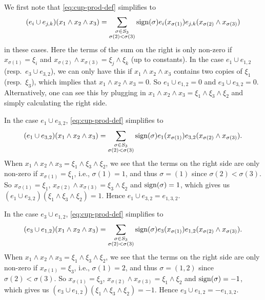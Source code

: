 We first note that \eqref{eq:cup-prod-def} simplifies to
\begin{equation*}
  (e_{i} \cup e_{j,k})(x_{1} \wedge x_{2} \wedge x_{3}) = \sum_{\substack{\sigma \in S_{3} \\ \sigma(2) < \sigma(3)}} \operatorname{sign}(\sigma) e_{i}(x_{\sigma(1)}) e_{j,k}(x_{\sigma(2)} \wedge x_{\sigma(3)})
\end{equation*}
in these cases. Here the terms of the sum on the right is only non-zero if $x_{\sigma(1)} = \xi_{i}$ and $x_{\sigma(2)} \wedge x_{\sigma(3)} = \xi_{j} \wedge \xi_{k}$ (up to constants). In the case $e_{1} \cup e_{1,2}$ (resp.\ $e_{3} \cup e_{3,2}$), we can only have this if $x_{1} \wedge x_{2} \wedge x_{3}$ contains two copies of $\xi_{1}$ (resp.\ $\xi_{3}$), which implies that $x_{1} \wedge x_{2} \wedge x_{3} = 0$. So $e_{1} \cup e_{1,2} = 0$ and $e_{3} \cup e_{3,2} = 0$. Alternatively, one can see this by plugging in $x_{1} \wedge x_{2} \wedge x_{3} = \xi_{1} \wedge \xi_{3} \wedge \xi_{2}$ and simply calculating the right side.

In the case $e_{1} \cup e_{3,2}$, \eqref{eq:cup-prod-def} simplifies to
\begin{equation*}
  (e_{1} \cup e_{3,2})(x_{1} \wedge x_{2} \wedge x_{3}) = \sum_{\substack{\sigma \in S_{3} \\ \sigma(2) < \sigma(3)}} \operatorname{sign}(\sigma) e_{1}(x_{\sigma(1)}) e_{3,2}(x_{\sigma(2)} \wedge x_{\sigma(3)}).
\end{equation*}
When $x_{1} \wedge x_{2} \wedge x_{3} = \xi_{1} \wedge \xi_{3} \wedge \xi_{2}$, we see that the terms on the right side are only non-zero if $x_{\sigma(1)} = \xi_{1}$, i.e., $\sigma(1)=1$, and thus $\sigma = (1)$ since $\sigma(2) < \sigma(3)$. So $x_{\sigma(1)} = \xi_{1}$, $x_{\sigma(2)} \wedge x_{\sigma(3)} = \xi_{3} \wedge \xi_{2}$ and $\operatorname{sign}(\sigma) = 1$, which gives us $(e_{1} \cup e_{3,2})(\xi_{1} \wedge \xi_{3} \wedge \xi_{2}) = 1$. Hence $e_{1} \cup e_{3,2} = e_{1,3,2}$.

In the case $e_{3} \cup e_{1,2}$, \eqref{eq:cup-prod-def} simplifies to
\begin{equation*}
  (e_{3} \cup e_{1,2})(x_{1} \wedge x_{2} \wedge x_{3}) = \sum_{\substack{\sigma \in S_{3} \\ \sigma(2) < \sigma(3)}} \operatorname{sign}(\sigma) e_{3}(x_{\sigma(1)}) e_{1,2}(x_{\sigma(2)} \wedge x_{\sigma(3)}).
\end{equation*}
When $x_{1} \wedge x_{2} \wedge x_{3} = \xi_{1} \wedge \xi_{3} \wedge \xi_{2}$, we see that the terms on the right side are only non-zero if $x_{\sigma(1)} = \xi_{3}$, i.e., $\sigma(1)=2$, and thus $\sigma = (1,2)$ since $\sigma(2) < \sigma(3)$. So $x_{\sigma(1)} = \xi_{3}$, $x_{\sigma(2)} \wedge x_{\sigma(3)} = \xi_{1} \wedge \xi_{2}$ and $\operatorname{sign}(\sigma) = -1$, which gives us $(e_{3} \cup e_{1,2})(\xi_{1} \wedge \xi_{3} \wedge \xi_{2}) = -1$. Hence $e_{3} \cup e_{1,2} = -e_{1,3,2}$.

